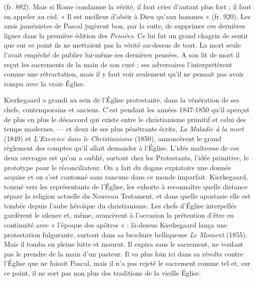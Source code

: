 \documentclass[12pt,a4paper]{article}
\newcommand{\opage}[1]{\marginnote{\footnotesize\textit{[#1]}}}
\begin{document}
\opage{239} (fr. 882). Mais si Rome condamne la vérité, il faut crier d'autant plus
fort ; il faut en appeler au ciel. « Il est meilleur d'obéir à Dieu qu'aux
hommes » (fr. 920). Les amis jansénistes de Pascal jugèrent bon,
par la suite, de supprimer ces dernières lignes dans la première édition
des \emph{Pensées}. Ce lui fut un grand chagrin de sentir que sur ce point
ils ne mettaient pas la vérité au-dessus de tout. La mort seule l'avait
empêché de publier lui-même ses dernières pensées. A son lit de mort
il reçut les sacrements de la main de son curé ; ses adversaires l'interprétèrent
comme une rétractation, mais il y faut voir seulement
qu'il ne pensait pas avoir rompu avec la vraie Église.

Kierkegaard a grandi au sein de l'Église protestante, dans la vénération
de ses chefs, contemporains et anciens. C'est pendant les
années 1847-1850 qu'il aperçut de plus en plus le désaccord qui
existe entre le christianisme primitif et celui des temps modernes, ---
et deux de ses plus pénétrants écrits, \emph{La Maladie à la mort} (1849) et
\emph{L'Exercice dans le Christianisme} (1850), annoncèrent le grand règlement
des comptes qu'il allait demander à l'Église. L'idée maîtresse
de ces deux ouvrages est qu'on a oublié, surtout chez les Protestants,
l'idée primitive, le prototype pour le réconciliateur. On a fait du
dogme expiatoire une donnée acquise et on s'est cantonné sans
rancune dans ce monde imparfait. Kierkegaard, tourné vers les
représentants de l'Église, les exhorte à reconnaître quelle distance
sépare la religion actuelle du Nouveau Testament, et dans quelle
apostasie elle est tombée depuis l'aube héroïque du christianisme.
Les chefs d'Église interpellés gardèrent le silence et, même, avancèrent
à l'occasion la prétention d'être en continuité avec « l'époque
des apôtres » : là-dessus Kierkegaard lança une protestation fulgurante,
surtout dans sa brochure belliqueuse \emph{Le Moment} (1855). Mais
il tomba en pleine lutte et mourut. Il expira sans le sacrement, ne
voulant pas le prendre de la main d'un pasteur. Il va plus loin ici
dans sa révolte contre l'Église que ne faisait Pascal, mais il n'a pas
rejeté le sacrement comme tel et, sur ce point, il ne sort pas non plus
des traditions de la vieille Église.
\end{document}
